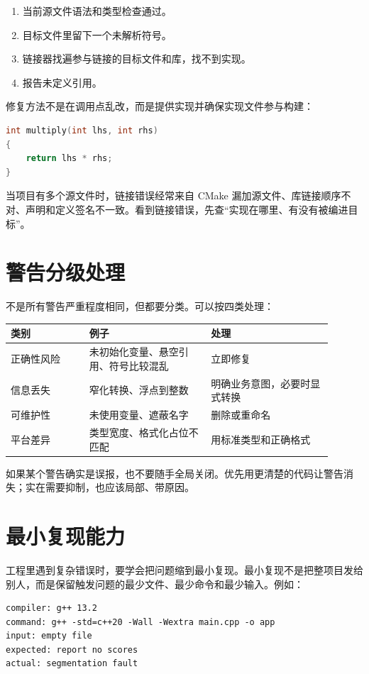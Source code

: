\begin{enumerate}
  \item 当前源文件语法和类型检查通过。
  \item 目标文件里留下一个未解析符号。
  \item 链接器找遍参与链接的目标文件和库，找不到实现。
  \item 报告未定义引用。
\end{enumerate}

修复方法不是在调用点乱改，而是提供实现并确保实现文件参与构建：

\begin{lstlisting}[language=C++,caption={提供函数定义}]
int multiply(int lhs, int rhs)
{
    return lhs * rhs;
}
\end{lstlisting}

当项目有多个源文件时，链接错误经常来自 CMake 漏加源文件、库链接顺序不对、声明和定义签名不一致。看到链接错误，先查“实现在哪里、有没有被编进目标”。

\section{警告分级处理}

不是所有警告严重程度相同，但都要分类。可以按四类处理：

\begin{longtable}{p{0.22\linewidth}p{0.34\linewidth}p{0.34\linewidth}}
\toprule
类别 & 例子 & 处理 \\
\midrule
正确性风险 & 未初始化变量、悬空引用、符号比较混乱 & 立即修复 \\
信息丢失 & 窄化转换、浮点到整数 & 明确业务意图，必要时显式转换 \\
可维护性 & 未使用变量、遮蔽名字 & 删除或重命名 \\
平台差异 & 类型宽度、格式化占位不匹配 & 用标准类型和正确格式 \\
\bottomrule
\end{longtable}

如果某个警告确实是误报，也不要随手全局关闭。优先用更清楚的代码让警告消失；实在需要抑制，也应该局部、带原因。

\section{最小复现能力}

工程里遇到复杂错误时，要学会把问题缩到最小复现。最小复现不是把整项目发给别人，而是保留触发问题的最少文件、最少命令和最少输入。例如：

\begin{lstlisting}[caption={最小复现记录}]
compiler: g++ 13.2
command: g++ -std=c++20 -Wall -Wextra main.cpp -o app
input: empty file
expected: report no scores
actual: segmentation fault
\end{lstlisting}

